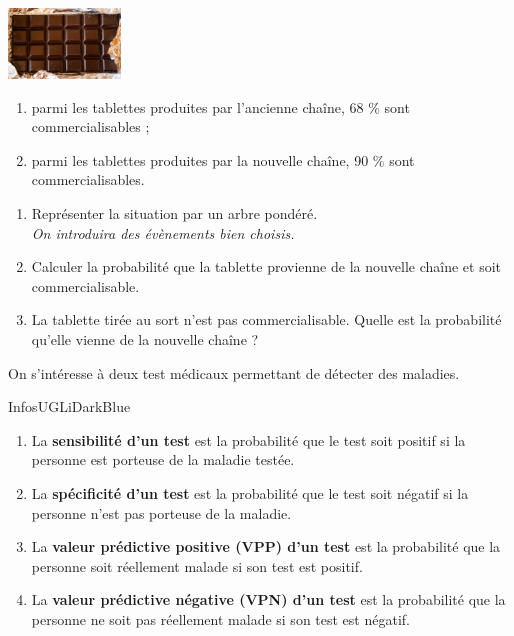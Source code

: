 \documentclass[a4paper,11pt,exos]{nsi} %
\begin{document}
\maketitle




\vspace*{1cm}
\exo{}%
\textcolor{UGLiBlue}{
{\includegraphics[width=3cm]{chocolate-1277002_640.jpg}}
\begin{enumerate}[label=\textbullet]
    \item parmi les tablettes produites par l'ancienne chaîne, 68 \% sont commercialisables ;
    \item parmi les tablettes produites par la nouvelle chaîne, 90 \% sont commercialisables.
\end{enumerate}
\begin{enumerate}
    \item Représenter la situation par un arbre pondéré.\\
    \textit{On introduira des évènements bien choisis.}
    \item Calculer la probabilité que la tablette provienne de la nouvelle chaîne et soit commercialisable.
    \item La tablette tirée au sort n'est pas commercialisable. Quelle est la probabilité qu'elle vienne de la nouvelle chaîne ?
\end{enumerate}}



\textcolor{UGLiBlue}{On s'intéresse à deux test médicaux permettant de détecter des maladies.
\begin{encadrecolore}{Infos}{UGLiDarkBlue}
    \begin{enumerate}[label=\textbullet]
        \item La \textbf{sensibilité d'un test} est la probabilité que le test soit positif si la personne est porteuse de la maladie testée.
        \item La \textbf{spécificité d'un test} est la probabilité que le test soit négatif si la personne n'est pas porteuse de la maladie.
        \item La \textbf{valeur prédictive positive (VPP) d'un test} est la probabilité que la personne soit réellement malade si son test est positif.
        \item La \textbf{valeur prédictive négative (VPN) d'un test} est la probabilité que la personne ne soit pas réellement malade si son test est négatif.
    \end{enumerate}
\end{encadrecolore}}
\end{document}
